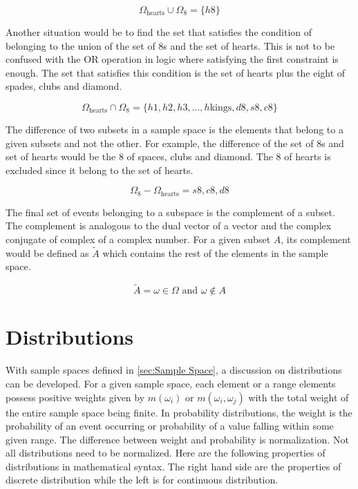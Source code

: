 \documentclass[11pt,a4paper]{book}
\begin{document}
		\begin{equation}
		\Omega_{\text{hearts}} \cup \Omega_{\text{8}} = \{h8\}
		\end{equation}
		
		\noindent Another situation would be to find the set that satisfies the condition of belonging to the union of the set of 8s and the set of hearts. This is not to be confused with the OR operation in logic where satisfying the first constraint is enough. The set that satisfies this condition is the set of hearts plus the eight of spades, clubs and diamond. 
		
		\begin{equation}
		\Omega_{\text{hearts}} \cap \Omega_{\text{8}} = \{h1, h2, h3, ... , h\text{kings}, d8, s8, c8\}
		\end{equation}
		
		\noindent The difference of two subsets in a sample space is the elements that belong to a given subsets and not the other. For example, the difference of the set of 8s and set of hearts would be the 8 of spaces, clubs and diamond. The 8 of hearts is excluded since it belong to the set of hearts.
		
		\begin{equation}
		\Omega_{8} - \Omega_{\text{hearts}} = {s8, c8, d8}
		\end{equation}
		
		\noindent The final set of events belonging to a subspace is the complement of a subset. The complement is analogous to the dual vector of a vector and the complex conjugate of complex of a complex number. For a given subset $A$, its complement would be defined as $\tilde{A}$ which contains the rest of the elements in the sample space.
		
		\begin{equation}
		\tilde{A} = \omega \in \Omega \text{ and } \omega \notin A
		\end{equation}
		
	\section{Distributions}
		\label{sec:Distributions}
		With sample spaces defined in \autoref{sec:Sample Space}, a discussion on distributions can be developed. 	For a given sample space, each element or a range elements possess positive weights given by $m(\omega_i) $ or $m(\omega_i,\omega_j)$ with the total weight of the entire sample space being finite. In probability distributions, the weight is the probability of an event occurring or probability of a value falling within some given range. The difference between weight and probability is normalization. Not all distributions need to be normalized. Here are the following properties of distributions in mathematical syntax. The right  hand side are the properties of discrete distribution while the left is for continuous distribution.
		
\end{document}
